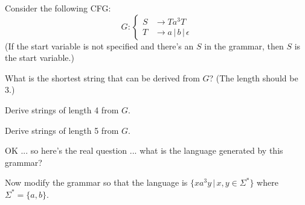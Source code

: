 Consider the following CFG:
\[
G: 
\begin{cases}
S &\rightarrow Ta^3T \\
T &\rightarrow a \,|\, b \,|\, \epsilon 
\end{cases}
\]
(If the start variable is not specified and there's an $S$ in the grammar, 
then $S$ is the start variable.)
\begin{tightlist}
\item What is the shortest string that can be derived from $G$?
(The length should be 3.)
\item Derive strings of length 4 from $G$.
\item Derive strings of length 5 from $G$.
\item OK ... so here's the real question ... what is the language
generated by this grammar?
\item Now modify the grammar so that the language is
$\{xa^3y \,|\, x, y \in \Sigma^*\}$ where $\Sigma^* = \{a, b\}$.
\end{tightlist}
